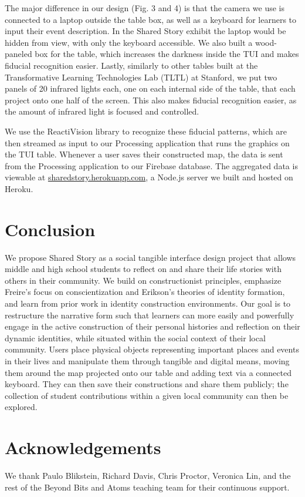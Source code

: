 \documentclass{sigchi-ext}
\begin{document}
The major difference in our design (Fig. 3 and 4) is that the camera we use is connected to a laptop outside the table box, as well as a keyboard for learners to input their event description. In the Shared Story exhibit the laptop would be hidden from view, with only the keyboard accessible. We also built a wood-paneled box for the table, which increases the darkness inside the TUI and makes fiducial recognition easier. Lastly, similarly to other tables built  at the Transformative Learning Technologies Lab (TLTL) at Stanford, we put two panels of 20 infrared lights each, one on each internal side of the table, that each project onto one half of the screen. This also makes fiducial recognition easier, as the amount of infrared light is focused and controlled.

We use the ReactiVision library to recognize these fiducial patterns, which are then streamed as input to our Processing application that runs the graphics on the TUI table. Whenever a user saves their constructed map, the data is sent from the Processing application to our Firebase database. The aggregated data is viewable at \url{sharedstory.herokuapp.com}, a Node.js server we built and hosted on Heroku.

\section{Conclusion}
We propose Shared Story as a social tangible interface design project that allows middle and high school students to reflect on and share their life stories with others in their community. We build on constructionist principles, emphasize Freire's focus on conscientization and Erikson's theories of identity formation, and learn from prior work in identity construction environments. Our goal is to restructure the narrative form such that learners can more easily and powerfully engage in the active construction of their personal histories and reflection on their dynamic identities, while situated within the social context of their local community. Users place physical objects representing important places and events in their lives and manipulate them through tangible and digital means, moving them around the map projected onto our table and adding text via a connected keyboard. They can then save their constructions and share them publicly; the collection of student contributions within a given local community can then be explored.

\section{Acknowledgements}
We thank Paulo Blikstein, Richard Davis, Chris Proctor, Veronica Lin, and the rest of the Beyond Bits and Atoms teaching team for their continuous support.
\end{document}
